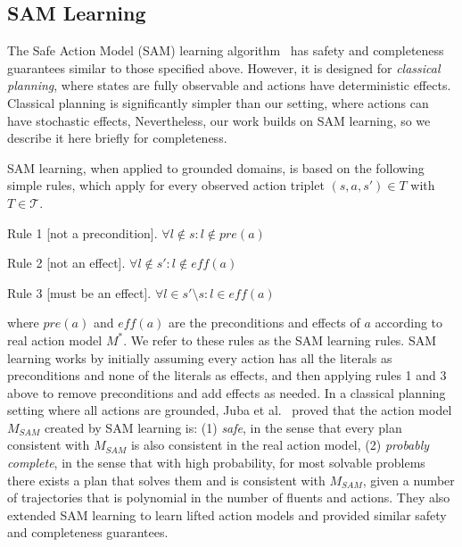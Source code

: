 \documentclass[letterpaper]{article} %
\newcommand{\eff}{\textit{eff}}
\newcommand{\pre}{\textit{pre}}
\newcommand{\sam}{\textit{SAM}}
\begin{document}






\subsection{SAM Learning}

The Safe Action Model (SAM) learning algorithm~\cite{juba2021kr,stern2017efficientAndSafe} has safety and completeness guarantees similar to those specified above. 
However, it is designed for \emph{classical planning}, where states are fully observable and actions have deterministic effects. 
Classical planning is significantly simpler than our setting, where actions can have stochastic effects, 
Nevertheless, our work builds on SAM learning, so we describe it here briefly for completeness. 


SAM learning, when applied to grounded domains, is based on the following simple rules, which apply for every observed action triplet $(s,a,s')\in T$ with $T\in \mathcal{T}$.
\begin{compactenum}
    \item Rule 1 [not a precondition].  $\forall l \notin s: l \notin \pre(a)$
    \item Rule 2 [not an effect].  $\forall l \notin s': l \notin \eff(a)$
    \item Rule 3 [must be an effect].  $\forall l \in s'\setminus s: l \in \eff(a)$
\end{compactenum}
where $\pre(a)$ and $\eff(a)$ are the preconditions and effects of $a$ according to real action model $M^*$. 
We refer to these rules as the SAM learning rules. 
SAM learning works by initially assuming every action has all the literals as preconditions and none of the literals as effects, and then applying rules 1 and 3 above to remove preconditions and add effects as needed. 
In a classical planning setting where all actions are grounded, Juba et al.~ proved that the action model $M_{\sam}$ created by SAM learning is: (1) \emph{safe}, in the sense that every plan consistent with $M_{\sam}$ is also consistent in the real action model, (2) \emph{probably complete}, in the sense that with high probability, 
for most solvable problems there exists a plan that solves them and is consistent with $M_{\sam}$, given a number of trajectories that is polynomial in the number of fluents and actions. 
They also extended SAM learning to learn lifted action models and provided similar safety and completeness guarantees. 
\end{document}
